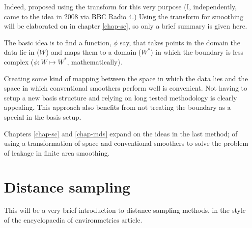 \begin{enumerate}
Indeed, \cite{eilerstalk} proposed using the \sch transform for this very purpose (I, independently, came to the idea in 2008 via BBC Radio 4.) Using the \sch transform for smoothing will be elaborated on in chapter \ref{chap-sc}, so only a brief summary is given here.

The basic idea is to find a function, $\phi$ say, that takes points in the domain the data lie in ($W$) and maps them to a domain ($W^*$) in which the boundary is less complex ($\phi : W \mapsto W^*$, mathematically).

Creating some kind of mapping between the space in which the data lies and the space in which conventional smoothers perform well is convenient. Not having to setup a new basis structure and relying on long tested methodology is clearly appealing. This approach also benefits from not treating the boundary as a special in the basis setup.
\end{enumerate}

Chapters \ref{chap-sc} and \ref{chap-mds} expand on the ideas in the last method; of using a transformation of space and conventional smoothers to solve the problem of leakage in finite area smoothing.

\section{Distance sampling}

This will be a very brief introduction to distance sampling methods, in the style of the encyclopaedia of environmetrics article.
